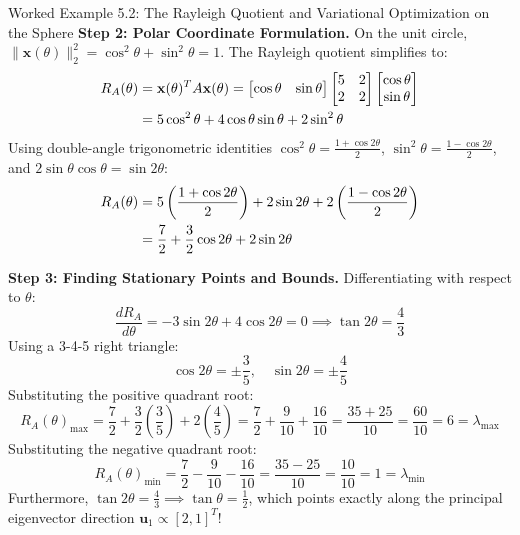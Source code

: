 \begin{examplebox}{Worked Example 5.2: The Rayleigh Quotient and Variational Optimization on the Sphere}
\textbf{Step 2: Polar Coordinate Formulation.}
On the unit circle, $\|\mathbf{x}(\theta)\|_2^2 = \cos^2\theta + \sin^2\theta = 1$. The Rayleigh quotient simplifies to:
\begin{align}
R_A(\theta) &= \mathbf{x}(\theta)^T A \mathbf{x}(\theta) = \begin{bmatrix} \cos\theta & \sin\theta \end{bmatrix} \begin{bmatrix} 5 & 2 \\ 2 & 2 \end{bmatrix} \begin{bmatrix} \cos\theta \\ \sin\theta \end{bmatrix} \notag \\
&= 5\cos^2\theta + 4\cos\theta\sin\theta + 2\sin^2\theta
\end{align}
Using double-angle trigonometric identities $\cos^2\theta = \frac{1 + \cos 2\theta}{2}$, $\sin^2\theta = \frac{1 - \cos 2\theta}{2}$, and $2\sin\theta\cos\theta = \sin 2\theta$:
\begin{align}
R_A(\theta) &= 5\left(\frac{1 + \cos 2\theta}{2}\right) + 2\sin 2\theta + 2\left(\frac{1 - \cos 2\theta}{2}\right) \notag \\
&= \frac{7}{2} + \frac{3}{2}\cos 2\theta + 2\sin 2\theta
\end{align}

\textbf{Step 3: Finding Stationary Points and Bounds.}
Differentiating with respect to $\theta$:
\begin{equation}
\frac{dR_A}{d\theta} = -3\sin 2\theta + 4\cos 2\theta = 0 \implies \tan 2\theta = \frac{4}{3}
\end{equation}
Using a 3-4-5 right triangle:
\begin{equation}
\cos 2\theta = \pm \frac{3}{5}, \quad \sin 2\theta = \pm \frac{4}{5}
\end{equation}
Substituting the positive quadrant root:
\begin{equation}
R_A(\theta)_{\max} = \frac{7}{2} + \frac{3}{2}\left(\frac{3}{5}\right) + 2\left(\frac{4}{5}\right) = \frac{7}{2} + \frac{9}{10} + \frac{16}{10} = \frac{35 + 25}{10} = \frac{60}{10} = 6 = \lambda_{\max}
\end{equation}
Substituting the negative quadrant root:
\begin{equation}
R_A(\theta)_{\min} = \frac{7}{2} - \frac{9}{10} - \frac{16}{10} = \frac{35 - 25}{10} = \frac{10}{10} = 1 = \lambda_{\min}
\end{equation}
Furthermore, $\tan 2\theta = \frac{4}{3} \implies \tan\theta = \frac{1}{2}$, which points exactly along the principal eigenvector direction $\mathbf{u}_1 \propto [2, 1]^T$!
\end{examplebox}

